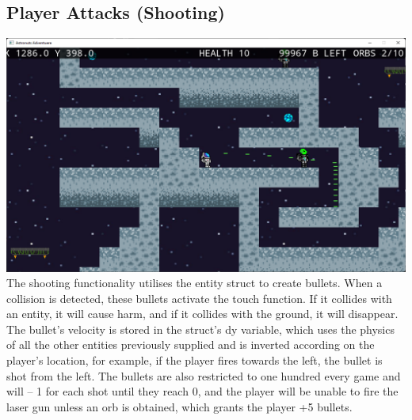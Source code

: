  \subsection{Player Attacks (Shooting)}
\includegraphics[width=1\linewidth]{images/ss1.png}
The shooting functionality utilises the entity struct to create bullets. When a collision is detected, these bullets activate the touch function. If it collides with an entity, it will cause harm, and if it collides with the ground, it will disappear. The bullet's velocity is stored in the struct's dy variable, which uses the physics of all the other entities previously supplied and is inverted according on the player's location, for example, if the player fires towards the left, the bullet is shot from the left. The bullets are also restricted to one hundred every game and will – 1 for each shot until they reach 0, and the player will be unable to fire the laser gun unless an orb is obtained, which grants the player +5 bullets.

 
 \newpage

